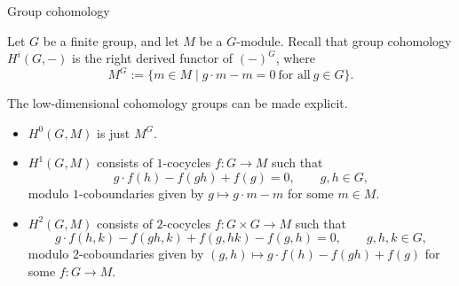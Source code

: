 \documentclass[10pt]{beamer}
\begin{document}
\begin{frame}[t]{Group cohomology}

Let $ G $ be a finite group, and let $ M $ be a $ G $-module. Recall that group cohomology $ H^i(G, -) $ is the right derived functor of $ (-)^G $, where
$$ M^G := \{m \in M \mid g \cdot m - m = 0 \ \text{for all} \ g \in G\}. $$

\pause

The low-dimensional cohomology groups can be made explicit.

\pause

\begin{itemize}
\item $ H^0(G, M) $ is just $ M^G $.

\pause

\item $ H^1(G, M) $ consists of $ 1 $-cocycles $ f : G \to M $ such that
$$ g \cdot f(h) - f(gh) + f(g) = 0, \qquad g, h \in G, $$
modulo $ 1 $-coboundaries given by $ g \mapsto g \cdot m - m $ for some $ m \in M $.

\pause

\item $ H^2(G, M) $ consists of $ 2 $-cocycles $ f : G \times G \to M $ such that
$$ g \cdot f(h, k) - f(gh, k) + f(g, hk) - f(g, h) = 0, \qquad g, h, k \in G, $$
modulo $ 2 $-coboundaries given by $ (g, h) \mapsto g \cdot f(h) - f(gh) + f(g) $ for some $ f : G \to M $.
\end{itemize}

\end{frame}
\end{document}
